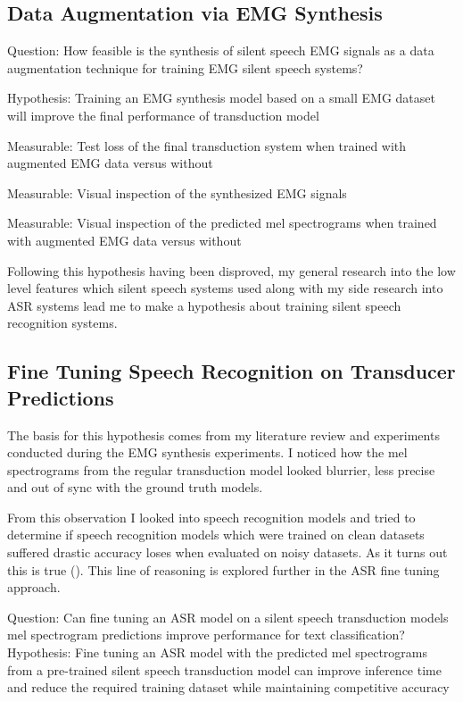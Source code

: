 \subsection{Data Augmentation via EMG Synthesis}

Question: How feasible is the synthesis of silent speech EMG signals
as a data augmentation technique for training EMG silent speech systems?

Hypothesis: Training an EMG synthesis model based on a small
EMG dataset will improve the final performance of transduction model

Measurable: Test loss of the final transduction system when trained
with augmented EMG data versus without

Measurable: Visual inspection of the synthesized EMG signals

Measurable: Visual inspection of the predicted mel spectrograms when
trained with augmented EMG data versus without

Following this hypothesis having been disproved, my general research
into the low level features which silent speech systems used 
along with my side research into ASR systems lead me to make a hypothesis
about training silent speech recognition systems.

\subsection{Fine Tuning Speech Recognition on Transducer Predictions }

The basis for this hypothesis comes from my literature review and
experiments conducted during the EMG synthesis experiments. I noticed
how the mel spectrograms from the regular transduction model looked
blurrier, less precise and out of sync with the ground truth models.

From this observation I looked into speech recognition models and
tried to determine if speech recognition models which were trained
on clean datasets suffered drastic accuracy loses when evaluated
on noisy datasets. As it turns out this is true (\cite{DS2_original}).
This line of reasoning is explored further in the ASR fine tuning approach.

Question: Can fine tuning an ASR model on a silent speech
transduction models mel spectrogram predictions improve performance for
text classification? \\

Hypothesis: Fine tuning an ASR model with the predicted
mel spectrograms from a pre-trained silent speech transduction model
can improve inference time and reduce the required training dataset
while maintaining competitive accuracy \\

